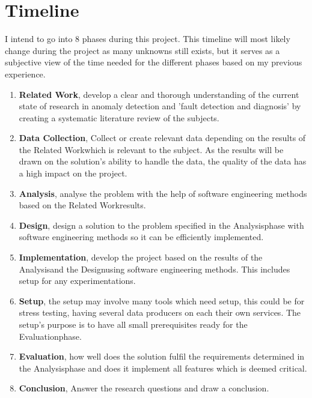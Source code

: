 \documentclass[a4paper,8pt]{article}
\newcommand{\Phases}{8 }
\newcommand{\phaseq}{Related Work}
\newcommand{\phasew}{Data Collection}
\newcommand{\phasee}{Analysis}
\newcommand{\phaser}{Design}
\newcommand{\phaset}{Implementation}
\newcommand{\phaseSetup}{Setup}
\newcommand{\phasey}{Evaluation}
\newcommand{\phaseu}{Conclusion}
\begin{document}
	\section{Timeline}
	I intend to go into \Phases phases during this project. This timeline will most likely change during the project as many unknowns still exists, but it serves as a subjective view of the time needed for the different phases based on my previous experience.
		\begin{enumerate}
			\item \textbf{\phaseq}, develop a clear and thorough understanding of the current state of research in anomaly detection and 'fault detection and diagnosis' by creating a systematic literature review of the subjects.
			\item \textbf{\phasew}, Collect or create relevant data depending on the results of the \phaseq \space which is relevant to the subject. As the results will be drawn on the solution's ability to handle the data, the quality of the data has a high impact on the project.
			\item \textbf{\phasee}, analyse the problem with the help of software engineering methods based on the \phaseq \space results.
			\item \textbf{\phaser}, design a solution to the problem specified in the \phasee \space phase with software engineering methods so it can be efficiently implemented.
			\item \textbf{\phaset}, develop the project based on the results of the \phasee \space and the \phaser \space using software engineering methods. This includes setup for any experimentations.
			\item \textbf{\phaseSetup}, the setup may involve many tools which need setup, this could be for stress testing, having several data producers on each their own services. The setup's purpose is to have all small prerequisites ready for the \phasey \space phase.
			\item \textbf{\phasey}, how well does the solution fulfil the requirements determined in the \phasee \space phase and does it implement all features which is deemed critical.
			\item \textbf{\phaseu}, Answer the research questions and draw a conclusion.
		\end{enumerate}
	
\end{document}
